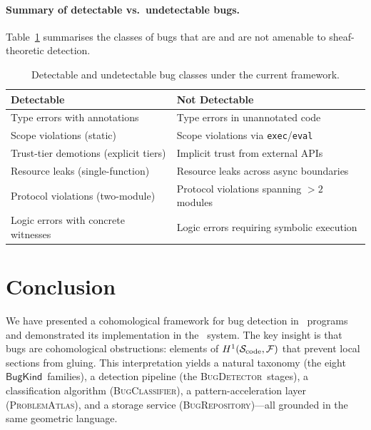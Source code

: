 \documentclass[11pt]{article}
\newcommand{\BugKind}{\ensuremath{\mathsf{BugKind}}}          %
\newcommand{\BugDet}{\textsc{BugDetector}}        %
\newcommand{\BugClass}{\textsc{BugClassifier}}    %
\newcommand{\BugRepo}{\textsc{BugRepository}}     %
\newcommand{\ProbAtlas}{\textsc{ProblemAtlas}}    %
\newcommand{\SemSite}{\mathcal{S}_{\mathrm{code}}}%
\begin{document}
\paragraph{Summary of detectable vs.\ undetectable bugs.}
Table~\ref{tab:limits} summarises the classes of bugs that are
and are not amenable to sheaf-theoretic detection.

\begin{table}[h!]
\centering
\caption{Detectable and undetectable bug classes under the
  current framework.}\label{tab:limits}
\begin{tabular}{p{5.5cm}p{5.5cm}}
\toprule
\textbf{Detectable} & \textbf{Not Detectable} \\
\midrule
Type errors with annotations &
  Type errors in unannotated code \\
Scope violations (static) &
  Scope violations via \texttt{exec}/\texttt{eval} \\
Trust-tier demotions (explicit tiers) &
  Implicit trust from external APIs \\
Resource leaks (single-function) &
  Resource leaks across async boundaries \\
Protocol violations (two-module) &
  Protocol violations spanning $>2$ modules \\
Logic errors with concrete witnesses &
  Logic errors requiring symbolic execution \\
\bottomrule
\end{tabular}
\end{table}

\section{Conclusion}\label{sec:conclusion}

We have presented a cohomological framework for bug detection in \Python\
programs and demonstrated its implementation in the \JuGeo\ system.  The
key insight is that bugs are cohomological obstructions: elements of
$\Hcoh{1}(\SemSite,\mathcal{F})$ that prevent local sections from gluing.
This interpretation yields a natural taxonomy (the eight \BugKind\
families), a detection pipeline (the \BugDet\ stages), a classification
algorithm (\BugClass), a pattern-acceleration layer (\ProbAtlas), and a
storage service (\BugRepo)---all grounded in the same geometric language.
\end{document}
